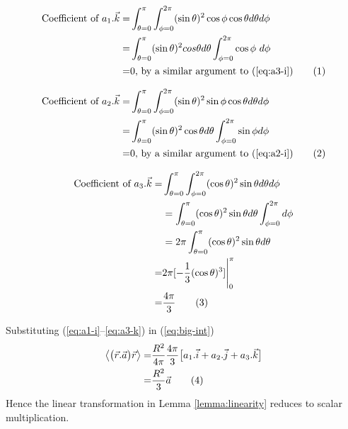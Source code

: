 \documentclass[]{article}
\newcommand\numberthis{\addtocounter{equation}{1}\tag{\theequation}}
\begin{document}
\begin{align*}
\text{Coefficient of }a_1.\vec{k} =&\int_{\theta=0}^{\pi}\int_{\phi=0}^{2\pi}(\sin\theta)^2\cos\phi\cos\theta d\theta d\phi\\=&
\int_{\theta=0}^{\pi}  (\sin\theta)^2 cos\theta d\theta \int_{\phi=0}^{2\pi}\cos\phi\ d\phi\\
=&0 \text{, by a similar argument to (\ref{eq:a3-i})} \numberthis \label{eq:a1-k}
\end{align*}

\begin{align*}
\text{Coefficient of }a_2.\vec{k} =&\int_{\theta=0}^{\pi}\int_{\phi=0}^{2\pi}(\sin\theta)^2\sin\phi\cos\theta d\theta d\phi\\=&
\int_{\theta=0}^{\pi} (\sin\theta)^2 \cos\theta d\theta \int_{\phi=0}^{2\pi}\sin\phi d\phi\\=&0 \text{, by a similar argument to (\ref{eq:a2-i})} \numberthis \label{eq:a2-k}
\end{align*}

\begin{align*}
\text{Coefficient of }a_3.\vec{k} =&\int_{\theta=0}^{\pi} \int_{\phi=0}^{2\pi} (\cos\theta)^2\sin\theta d\theta   d\phi\\ &= \int_{\theta=0}^{\pi} (\cos\theta)^2\sin\theta d\theta  \int_{\phi=0}^{2\pi} d\phi \\ &= 2 \pi \int_{\theta=0}^{\pi} (\cos\theta)^2\sin\theta d\theta \\
=& 2\pi[-\frac{1}{3}(\cos\theta)^3] \Bigg|_0^{\pi} \\
=& \frac{4\pi}{3}\numberthis \label{eq:a3-k}
\end{align*}

Substituting (\ref{eq:a1-i}--\ref{eq:a3-k})  in (\ref{eq:big-int})
\begin{align*}
\left\langle \big(\vec{r}.\vec{a}\big)\vec{r} \right\rangle=&\frac{ R^2}{4\pi}\frac{4\pi}{3}\big[a_1.\vec{i}+a_2.\vec{j}+a_3.\vec{k}\big]\\
=&\frac{R^2}{3}\vec{a} \numberthis \label{eq:final}
\end{align*}
Hence the linear transformation in Lemma \ref{lemma:linearity}  reduces to scalar multiplication.
\end{document}
